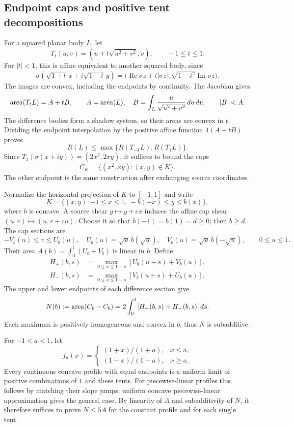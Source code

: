 \subsection{Endpoint caps and positive tent decompositions}
For a squared planar body $L$, let
\[
 T_t(u,v)=(u+t\sqrt{u^2+v^2},v),\qquad -1\leq t\leq1.
\]
For $|t|<1$, this is affine equivalent to another squared body, since
\[
 \sigma(\sqrt{1+t}\,x+i\sqrt{1-t}\,y)
 =\bigl(\operatorname{Re}\sigma z+t|\sigma z|,
         \sqrt{1-t^2}\operatorname{Im}\sigma z\bigr).
\]
The images are convex, including the endpoints by continuity. The
Jacobian gives
\[
 \operatorname{area}(T_tL)=A+tB,\qquad A=\operatorname{area}(L),\quad
 B=\int_L\frac{u}{\sqrt{u^2+v^2}}\,du\,dv,
 \qquad |B|<A.
\]
The difference bodies form a shadow system, so their areas are convex
in $t$. Dividing the endpoint interpolation by the positive affine
function $4(A+tB)$ proves
\[
 R(L)\leq\max\{R(T_{-1}L),R(T_1L)\}.
\]
Since $T_1(\sigma(x+iy))=(2x^2,2xy)$, it suffices to bound the caps
\[
 C_K=\{(x^2,xy):(x,y)\in K\}.
\]
The other endpoint is the same construction after exchanging source
coordinates.

Normalize the horizontal projection of $K$ to $[-1,1]$ and write
\[
 K=\{(x,y):-1\leq x\leq1,\ -b(-x)\leq y\leq b(x)\},
\]
where $b$ is concave. A source shear $y\mapsto y+cx$ induces the affine
cap shear $(u,v)\mapsto(u,v+cu)$. Choose it so that
$b(-1)=b(1)=d\geq0$; then $b\geq d$. The cap sections are
\[
 -V_b(u)\leq v\leq U_b(u),\quad
 U_b(u)=\sqrt u\,b(\sqrt u),\quad
 V_b(u)=\sqrt u\,b(-\sqrt u),\qquad 0\leq u\leq1.
\]
Their area $A(b)=\int_0^1(U_b+V_b)$ is linear in $b$. Define
\[
 \begin{aligned}
 H_+(b,s)&=\max_{0\leq u\leq1-s}
               [U_b(u+s)+V_b(u)],\\
 H_-(b,s)&=\max_{0\leq u\leq1-s}
               [V_b(u+s)+U_b(u)].
 \end{aligned}
\]
The upper and lower endpoints of each difference section give
\[
 N(b):=\operatorname{area}(C_b-C_b)
      =2\int_0^1[H_+(b,s)+H_-(b,s)]\,ds.
\]
Each maximum is positively homogeneous and convex in $b$; thus $N$ is
subadditive.

For $-1<a<1$, let
\[
 f_a(x)=\begin{cases}
 (1+x)/(1+a),&x\leq a,\\
 (1-x)/(1-a),&x\geq a.
 \end{cases}
\]
Every continuous concave profile with equal endpoints is a uniform limit
of positive combinations of $1$ and these tents. For piecewise-linear
profiles this follows by matching their slope jumps; uniform concave
piecewise-linear approximation gives the general case. By linearity of
$A$ and subadditivity of $N$, it therefore suffices to prove $N\leq5A$
for the constant profile and for each single tent.

